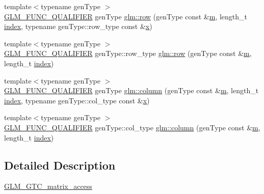 \begin{DoxyCompactItemize}
\item 
{\footnotesize template$<$typename gen\+Type $>$ }\\\hyperlink{setup_8hpp_a33fdea6f91c5f834105f7415e2a64407}{G\+L\+M\+\_\+\+F\+U\+N\+C\+\_\+\+Q\+U\+A\+L\+I\+F\+I\+ER} gen\+Type \hyperlink{group__gtc__matrix__access_gaadcc64829aadf4103477679e48c7594f}{glm\+::row} (gen\+Type const \&\hyperlink{_s_d_l__opengl__glext_8h_af593500c283bf1a787a6f947f503a5c2}{m}, length\+\_\+t \hyperlink{_s_d_l__opengl__glext_8h_a57f14e05b1900f16a2da82ade47d0c6d}{index}, typename gen\+Type\+::row\+\_\+type const \&\hyperlink{_s_d_l__opengl_8h_ad0e63d0edcdbd3d79554076bf309fd47}{x})
\item 
{\footnotesize template$<$typename gen\+Type $>$ }\\\hyperlink{setup_8hpp_a33fdea6f91c5f834105f7415e2a64407}{G\+L\+M\+\_\+\+F\+U\+N\+C\+\_\+\+Q\+U\+A\+L\+I\+F\+I\+ER} gen\+Type\+::row\+\_\+type \hyperlink{group__gtc__matrix__access_ga259e5ebd0f31ec3f83440f8cae7f5dba}{glm\+::row} (gen\+Type const \&\hyperlink{_s_d_l__opengl__glext_8h_af593500c283bf1a787a6f947f503a5c2}{m}, length\+\_\+t \hyperlink{_s_d_l__opengl__glext_8h_a57f14e05b1900f16a2da82ade47d0c6d}{index})
\item 
{\footnotesize template$<$typename gen\+Type $>$ }\\\hyperlink{setup_8hpp_a33fdea6f91c5f834105f7415e2a64407}{G\+L\+M\+\_\+\+F\+U\+N\+C\+\_\+\+Q\+U\+A\+L\+I\+F\+I\+ER} gen\+Type \hyperlink{group__gtc__matrix__access_ga9e757377523890e8b80c5843dbe4dd15}{glm\+::column} (gen\+Type const \&\hyperlink{_s_d_l__opengl__glext_8h_af593500c283bf1a787a6f947f503a5c2}{m}, length\+\_\+t \hyperlink{_s_d_l__opengl__glext_8h_a57f14e05b1900f16a2da82ade47d0c6d}{index}, typename gen\+Type\+::col\+\_\+type const \&\hyperlink{_s_d_l__opengl_8h_ad0e63d0edcdbd3d79554076bf309fd47}{x})
\item 
{\footnotesize template$<$typename gen\+Type $>$ }\\\hyperlink{setup_8hpp_a33fdea6f91c5f834105f7415e2a64407}{G\+L\+M\+\_\+\+F\+U\+N\+C\+\_\+\+Q\+U\+A\+L\+I\+F\+I\+ER} gen\+Type\+::col\+\_\+type \hyperlink{group__gtc__matrix__access_ga96022eb0d3fae39d89fc7a954e59b374}{glm\+::column} (gen\+Type const \&\hyperlink{_s_d_l__opengl__glext_8h_af593500c283bf1a787a6f947f503a5c2}{m}, length\+\_\+t \hyperlink{_s_d_l__opengl__glext_8h_a57f14e05b1900f16a2da82ade47d0c6d}{index})
\end{DoxyCompactItemize}


\subsection{Detailed Description}
\hyperlink{group__gtc__matrix__access}{G\+L\+M\+\_\+\+G\+T\+C\+\_\+matrix\+\_\+access} 